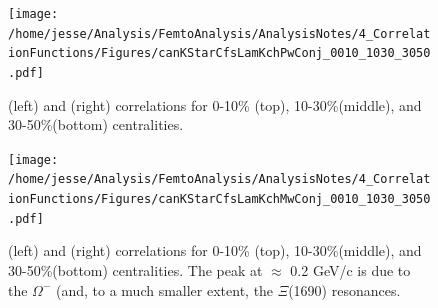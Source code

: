 \documentclass[/home/jesse/Analysis/FemtoAnalysis/AnalysisNotes/AnalysisNoteJBuxton.tex]{subfiles}
\begin{document}

\begin{figure}[h]
  \centering
  \texttt{[image: /home/jesse/Analysis/FemtoAnalysis/AnalysisNotes/4\_CorrelationFunctions/Figures/canKStarCfsLamKchPwConj\_0010\_1030\_3050.pdf]}
  \caption[\LamKchP \& \ALamKchM Correlation Functions]
  {
  \LamKchP (left) and \ALamKchM (right) correlations for 0-10\% (top), 10-30\%(middle), and 30-50\%(bottom) centralities.
  }
  \label{fig:AllCfs:a}
\end{figure}

\begin{figure}[h]
  \centering
  \texttt{[image: /home/jesse/Analysis/FemtoAnalysis/AnalysisNotes/4\_CorrelationFunctions/Figures/canKStarCfsLamKchMwConj\_0010\_1030\_3050.pdf]}
  \caption[\LamKchM \& \ALamKchP Correlation Functions]
  {
  \LamKchM (left) and \ALamKchP (right) correlations for 0-10\% (top), 10-30\%(middle), and 30-50\%(bottom) centralities.  
  The peak at \kstar $\approx$ 0.2 GeV/c is due to the $\Omega^{-}$ (and, to a much smaller extent, the $\Xi$(1690) resonances.
  }
  \label{fig:AllCfs:b}
\end{figure}
\end{document}

